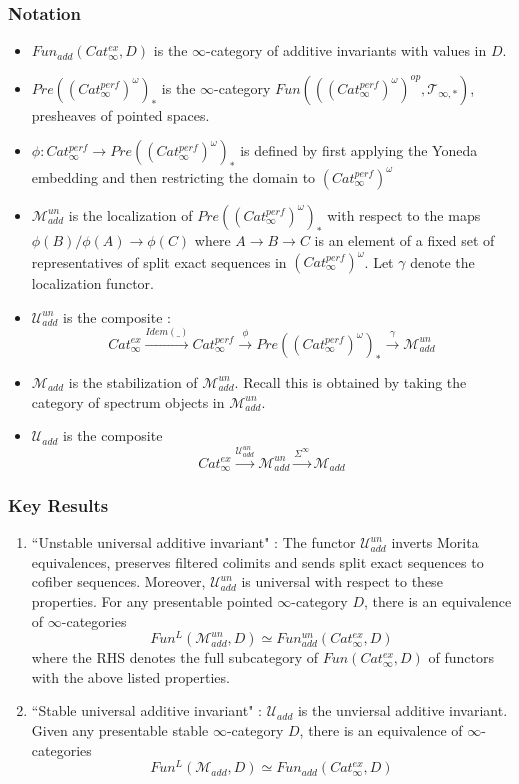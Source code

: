 \documentclass[letterpaper]{article}
\theoremstyle{definition}
\begin{document}
\subsubsection{Notation}
\begin{itemize}
\item $Fun_{add}(Cat_\infty^{ex},D)$ is the $\infty$-category of additive invariants with values in $D$. 
\item $Pre((Cat_\infty^{perf})^\omega)_*$ is the $\infty$-category $Fun(((Cat_\infty^{perf})^{\omega})^{op}, \mathcal{T}_{\infty,*})$, presheaves of pointed spaces. 
\item $\phi : Cat_\infty^{perf} \rightarrow Pre((Cat_\infty^{perf})^\omega)_*$ is defined by first applying the Yoneda embedding and then restricting the domain to $(Cat_\infty^{perf})^\omega$
\item $\mathcal{M}^{un}_{add}$ is the localization of $Pre((Cat_\infty^{perf})^\omega)_*$ with respect to the maps $\phi(B)/\phi(A) \rightarrow \phi(C)$ where $A \rightarrow B \rightarrow C$ is an element of a fixed set of representatives of split exact sequences in $(Cat_\infty^{perf})^\omega$. Let $\gamma$ denote the localization functor. 
\item $\mathcal{U}^{un}_{add}$ is the composite :
$$Cat_\infty^{ex} \overset{Idem(\_)}{\rightarrow} Cat_\infty^{perf} \overset{\phi}{\rightarrow} Pre((Cat_\infty^{perf})^\omega)_* \overset{\gamma}{\rightarrow} \mathcal{M}^{un}_{add}$$
\item $\mathcal{M}_{add}$ is the stabilization of $\mathcal{M}^{un}_{add}$. Recall this is obtained by taking the category of spectrum objects in $\mathcal{M}^{un}_{add}$. 
\item $\mathcal{U}_{add}$ is the composite
$$Cat_\infty^{ex} \overset{\mathcal{U}^{un}_{add}}{\rightarrow} \mathcal{M}^{un}_{add} \overset{\Sigma^{\infty}}{\rightarrow} \mathcal{M}_{add}$$
\end{itemize}

\subsubsection{Key Results}

\begin{enumerate}
\item ``Unstable universal additive invariant" : The functor $\mathcal{U}^{un}_{add}$ inverts Morita equivalences, preserves filtered colimits and sends split exact sequences to cofiber sequences. Moreover, $\mathcal{U}^{un}_{add}$ is universal with respect to these properties. For any presentable pointed $\infty$-category $D$, there is an equivalence of $\infty$-categories
$$Fun^L(\mathcal{M}^{un}_{add}, D) \simeq Fun^{un}_{add}(Cat_\infty^{ex},D)$$
where the RHS denotes the full subcategory of $Fun(Cat_\infty^{ex},D)$ of functors with the above listed properties. 
\item ``Stable universal additive invariant" : $\mathcal{U}_{add}$ is the unviersal additive invariant. Given any presentable stable $\infty$-category $D$, there is an equivalence of $\infty$-categories
$$Fun^L(\mathcal{M}_{add},D) \simeq Fun_{add}(Cat_\infty^{ex},D)$$
\end{enumerate}
\end{document}
